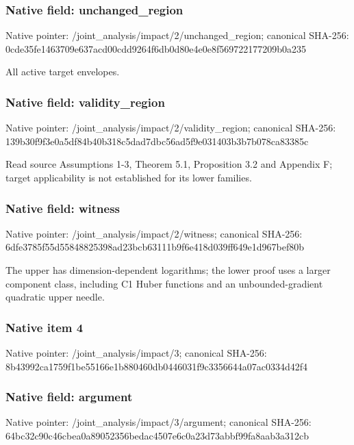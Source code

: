 \documentclass[10pt,a4paper]{article}
\begin{document}
\subsubsection{Native field: unchanged\_\allowbreak{}region}
Native pointer: /joint\_\allowbreak{}analysis/impact/2/unchanged\_\allowbreak{}region; canonical SHA-256: 0cde35fe1463709e637acd00cdd9264f6db0d80e4e0e8f569722177209b0a235

\begingroup\raggedright\sloppy All active target envelopes.\par\endgroup

\subsubsection{Native field: validity\_\allowbreak{}region}
Native pointer: /joint\_\allowbreak{}analysis/impact/2/validity\_\allowbreak{}region; canonical SHA-256: 139b30f9f3e0a5df84b40b318c5dad7dbc56ad5f9e031403b3b7b078ca83385c

\begingroup\raggedright\sloppy Read source Assumptions 1-3,\allowbreak{} Theorem 5.1,\allowbreak{} Proposition 3.2 and Appendix F;\allowbreak{} target applicability is not established for its lower families.\par\endgroup

\subsubsection{Native field: witness}
Native pointer: /joint\_\allowbreak{}analysis/impact/2/witness; canonical SHA-256: 6dfe3785f55d55848825398ad23bcb63111b9f6e418d039ff649e1d967bef80b

\begingroup\raggedright\sloppy The upper has dimension-dependent logarithms;\allowbreak{} the lower proof uses a larger component class,\allowbreak{} including C1 Huber functions and an unbounded-gradient quadratic upper needle.\par\endgroup

\subsubsection{Native item 4}
Native pointer: /joint\_\allowbreak{}analysis/impact/3; canonical SHA-256: 8b43992ca1759f1be55166e1b880460db0446031f9c3356644a07ac0334d42f4

\subsubsection{Native field: argument}
Native pointer: /joint\_\allowbreak{}analysis/impact/3/argument; canonical SHA-256: 64bc32c90c46cbea0a89052356bedac4507e6c0a23d73abbf99fa8aab3a312cb
\end{document}

